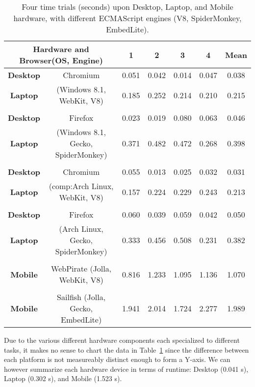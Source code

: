 \begin{table}[h]
\begin{center}
\begin{tabular}{ c c | c c c c | c }\hline
   \multicolumn{2}{c}{\textbf{Hardware and Browser(OS, Engine)}}  & \textbf{1}  & \textbf{2} & \textbf{3} & \textbf{4} & \textbf{Mean}   \\\hline
\textbf{Desktop}  & Chromium  & 0.051      & 0.042      & 0.014      & 0.047      & 0.038           \\
\textbf{Laptop}   &  (Windows 8.1, WebKit, V8)   & 0.185      & 0.252      & 0.214      & 0.210      & 0.215           \\
 & & & & & & \\
\textbf{Desktop} &  Firefox   & 0.023      & 0.019      & 0.080      & 0.063      & 0.046          \\
\textbf{Laptop}  &  (Windows 8.1, Gecko, SpiderMonkey)  & 0.371      & 0.482      & 0.472      & 0.268      & 0.398          \\
 & & & & & & \\
\textbf{Desktop} & Chromium  & 0.055      & 0.013      & 0.025      & 0.032      & 0.031           \\
\textbf{Laptop} & (\gls{comp:Arch} Linux, WebKit, V8) & 0.157 & 0.224 & 0.229 & 0.243 & 0.213 \\
 & & & & & & \\
\textbf{Desktop} & Firefox   & 0.060      & 0.039      & 0.059      & 0.042      & 0.050          \\
\textbf{Laptop}  & (Arch Linux, Gecko, SpiderMonkey)   & 0.333      & 0.456      & 0.508      & 0.231      & 0.382          \\
 & & & & & & \\
\textbf{Mobile}  & WebPirate (Jolla, WebKit, V8) & 0.816      & 1.233      & 1.095      & 1.136      & 1.070        \\
 & & & & & & \\
\textbf{Mobile}  & Sailfish (Jolla, Gecko, EmbedLite) & 1.941      & 2.014      & 1.724      & 2.277      & 1.989       \\
\hline
\end{tabular}
\end{center}
\vspace{-15pt}
\caption[HaploHTML5 A* Performance Table]{Four time trials (seconds) upon Desktop, Laptop, and Mobile hardware, with different ECMAScript engines (V8, SpiderMonkey, EmbedLite).}\label{table:res:haploastarperf}
\end{table}


Due to the various different hardware components each specialized to different tasks, it makes no sense to chart the data in Table~\ref{table:res:haploastarperf} since the difference between each platform is not measureably distinct enough to form a Y-axis. We can however summarize each hardware device in terms of runtime: Desktop (0.041 s), Laptop (0.302 s), and Mobile (1.523 s).







